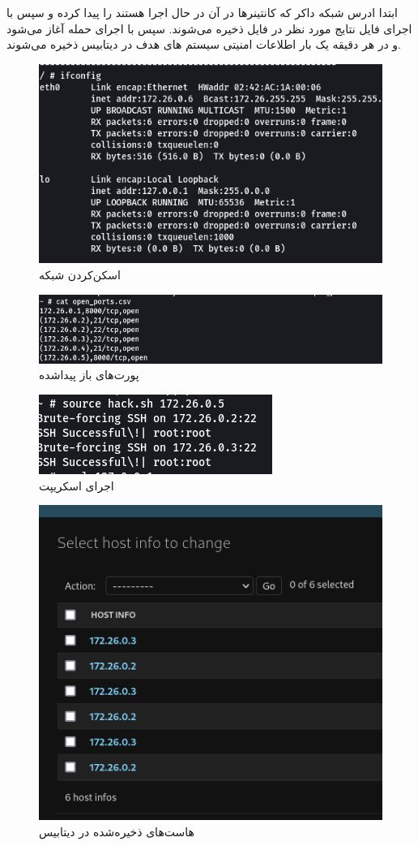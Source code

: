 ابتدا ادرس  شبکه داکر که کانتینرها در آن در حال اجرا هستند را پیدا کرده و سپس با اجرای فایل  نتایج مورد نظر در فایل  ذخیره می‌شوند. سپس با اجرای  حمله آغاز می‌شود و در هر دقیقه یک بار اطلاعات امنیتی سیستم های هدف در دیتابیس ذخیره می‌شوند.

\begin{figure}[h!]
    \centering
    \includegraphics[width=0.5\linewidth]{images/ifconfig.png}
    \caption{اسکن‌کردن شبکه}
    \label{fig:ifconfig}
\end{figure}

\begin{figure}[h!]
    \centering
    \includegraphics[width=0.5\linewidth]{images/open_ports.png}
    \caption{پورت‌های باز پیداشده}
    \label{fig:open_ports}
\end{figure}

\begin{figure}[h!]
    \centering
    \includegraphics[width=0.5\linewidth]{images/hack.png}
    \caption{اجرای اسکریپت }
    \label{fig:hack}
\end{figure}

\begin{figure}[h!]
    \centering
    \includegraphics[width=0.5\linewidth]{images/hosts.png}
    \caption{هاست‌های ذخیره‌شده در دیتابیس}
    \label{fig:hosts}
\end{figure}


